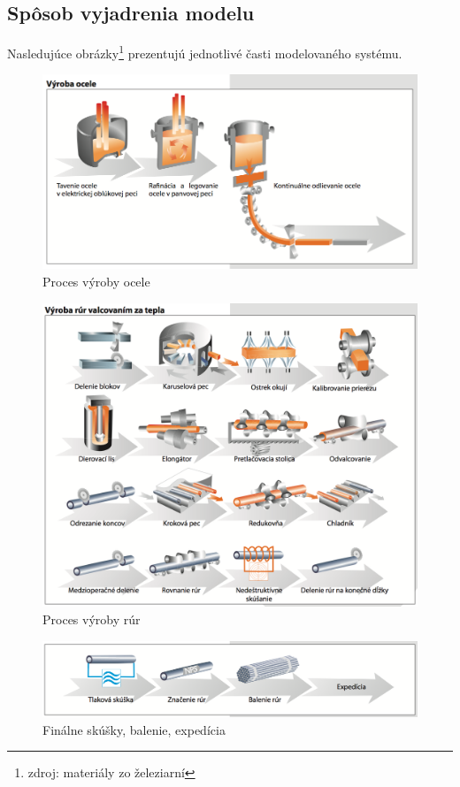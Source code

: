 \documentclass[]{article}
\begin{document}
\subsection{Spôsob vyjadrenia modelu}
Nasledujúce obrázky\footnote{zdroj: materiály zo železiarní} prezentujú jednotlivé časti modelovaného systému.

\begin{figure}[h!]
	\includegraphics[width=\textwidth]{vyroba_ocele.png}
	\caption{Proces výroby ocele}
\end{figure}

\begin{figure}[h!]
	\includegraphics[width=\textwidth]{vyroba_rur.png}
	\caption{Proces výroby rúr}
\end{figure}

\newpage

\begin{figure}[h!]
	\includegraphics[width=\textwidth]{expedicia.png}
	\caption{Finálne skúšky, balenie, expedícia}
\end{figure}
\end{document}
